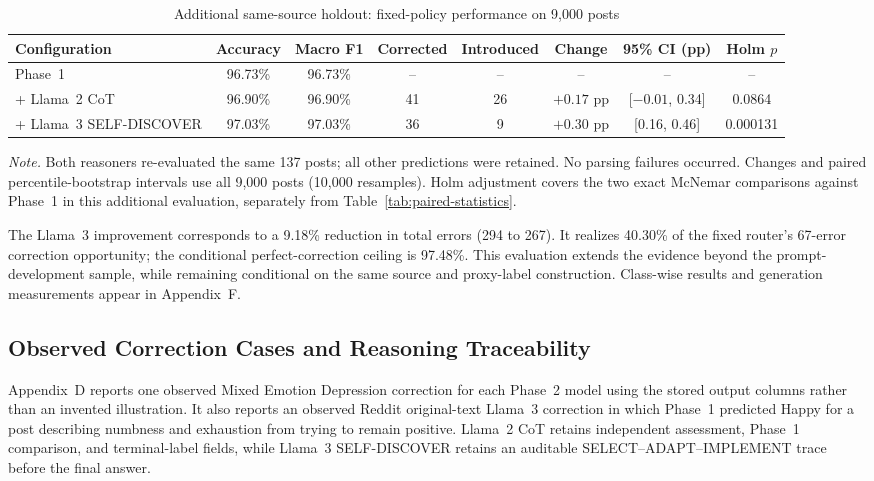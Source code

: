 \documentclass{ieeeaccess}
\begin{document}
\begin{table}[t]
\centering
\caption{Additional same-source holdout: fixed-policy performance on 9,000 posts}
\label{tab:additional-holdout}
\footnotesize
\setlength{\tabcolsep}{4pt}
\renewcommand{\arraystretch}{1.16}
\begin{tabularx}{\textwidth}{@{}Y c c c c c c c@{}}
\toprule
Configuration & Accuracy & Macro F1 & Corrected & Introduced & Change & 95\% CI (pp) & Holm $p$ \\
\midrule
Phase~1 & 96.73\% & 96.73\% & -- & -- & -- & -- & -- \\
+ Llama~2 CoT & 96.90\% & 96.90\% & 41 & 26 & $+0.17$ pp & [$-0.01$, 0.34] & 0.0864 \\
+ Llama~3 SELF-DISCOVER & 97.03\% & 97.03\% & 36 & 9 & $+0.30$ pp & [0.16, 0.46] & 0.000131 \\
\bottomrule
\end{tabularx}
\vspace{2pt}
\parbox{\textwidth}{\footnotesize\textit{Note.} Both reasoners re-evaluated the same 137 posts; all other predictions were retained. No parsing failures occurred. Changes and paired percentile-bootstrap intervals use all 9,000 posts (10,000 resamples). Holm adjustment covers the two exact McNemar comparisons against Phase~1 in this additional evaluation, separately from Table~\ref{tab:paired-statistics}.}
\end{table}

The Llama~3 improvement corresponds to a 9.18\% reduction in total errors (294 to 267). It realizes 40.30\% of the fixed router's 67-error correction opportunity; the conditional perfect-correction ceiling is 97.48\%. This evaluation extends the evidence beyond the prompt-development sample, while remaining conditional on the same source and proxy-label construction. Class-wise results and generation measurements appear in Appendix~F.

\subsection{Observed Correction Cases and Reasoning Traceability}

Appendix~D reports one observed Mixed Emotion Depression correction for each Phase~2 model using the stored output columns rather than an invented illustration. It also reports an observed Reddit original-text Llama~3 correction in which Phase~1 predicted Happy for a post describing numbness and exhaustion from trying to remain positive. Llama~2 CoT retains independent assessment, Phase~1 comparison, and terminal-label fields, while Llama~3 SELF-DISCOVER retains an auditable SELECT--ADAPT--IMPLEMENT trace before the final answer.
\end{document}
